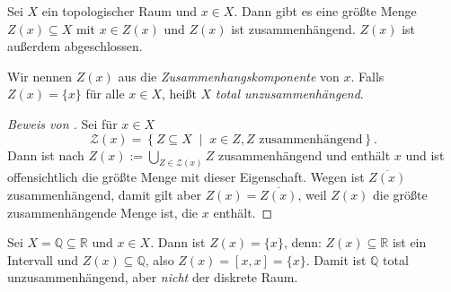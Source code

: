 \documentclass[
12pt, 
openany, 
a4paper, 
final,
fleqn, 
]{myclass}
\numberwithin{equation}{chapter}
\numberwithin{section}{chapter}
\newcommand{\QQ}{\mathbb Q}
\newcommand{\RR}{\mathbb R}
\newcommand{\varZ}{\mathcal Z}
\newcommand{\union}{\bigcup}
\newcommand{\closure}[1]{\overline{#1}}
\newcommand{\set}[2]{\left\{#1\;\middle|\;#2\right\}}
\begin{document}
\begin{cor}\label{3.7}
Sei $X$ ein topologischer Raum und $x\in X$. Dann gibt es eine größte Menge $Z(x) \subseteq X$ mit $x\in Z(x)$ und $Z(x)$ ist zusammenhängend. $Z(x)$ ist außerdem abgeschlossen.
\end{cor}
\begin{defn}
Wir nennen $Z(x)$ aus  die \emph{Zusammenhangskomponente} von $x$. Falls $Z(x) = \{x\}$ für alle $x\in X$, heißt $X$ \emph{total unzusammenhängend}.
\end{defn}
\begin{proof}[Beweis von ]
Sei für $x\in X$
\[
\varZ(x)=\set{Z\subseteq X}{x\in Z, Z \text{ zusammenhängend}}.
\]
Dann ist nach  $Z(x) := \union_{Z\in \varZ(x)}Z$ zusammenhängend und enthält $x$ und ist offensichtlich die größte Menge mit dieser Eigenschaft. Wegen  ist $\closure{Z(x)}$ zusammenhängend, damit gilt aber $Z(x) = \closure{Z(x)}$, weil $Z(x)$ die größte zusammenhängende Menge ist, die $x$ enthält. 
\end{proof}
\begin{eg}\label{3.8}
Sei $X= \QQ\subseteq \RR$ und $x\in X$. Dann ist $Z(x) = \{x\}$, denn: $Z(x) \subseteq \RR$ ist ein Intervall und $Z(x) \subseteq \QQ$, also $Z(x) = [x, x] = \{x\}$. Damit ist $\QQ$ total unzusammenhängend, aber \emph{nicht} der diskrete Raum.
\end{eg}
\end{document}
